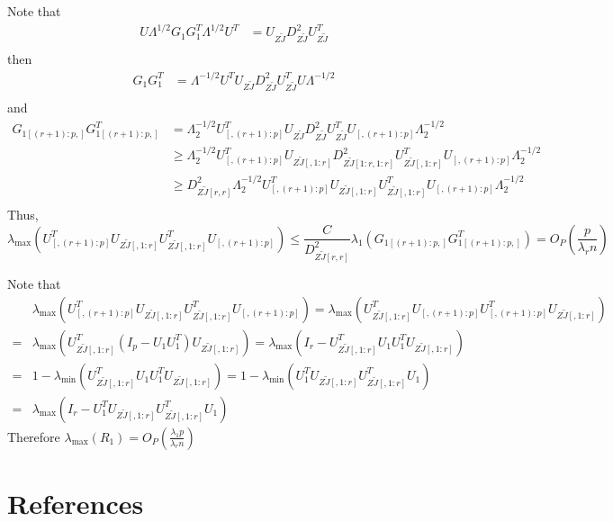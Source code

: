 \documentclass[review]{elsarticle}
\theoremstyle{plain}
\theoremstyle{definition}
\theoremstyle{remark}
\begin{document}
Note that
$$
\begin{aligned}
U\Lambda^{1/2} G_1 G_1^T \Lambda^{1/2} U^T 
    &=U_{Z\tilde{J}}D_{Z\tilde{J}}^2 U_{Z\tilde{J}}^T\\
\end{aligned}
$$
then
$$
\begin{aligned}
G_1 G_1^T  
    &=\Lambda^{-1/2} U^T U_{Z\tilde{J}}D_{Z\tilde{J}}^2 U_{Z\tilde{J}}^TU\Lambda^{-1/2}\\
\end{aligned}
$$
and
$$
\begin{aligned}
    G_{1[(r+1):p,]} G_{1[(r+1):p,]}^T  
    &=\Lambda_{2}^{-1/2} U_{[,(r+1):p]}^T U_{Z\tilde{J}}D_{Z\tilde{J}}^2 U_{Z\tilde{J}}^T U_{[,(r+1):p]}\Lambda_{2}^{-1/2}\\
    &\geq
    \Lambda_{2}^{-1/2} U_{[,(r+1):p]}^T U_{Z\tilde{J}[,1:r]}D_{Z\tilde{J}[1:r,1:r]}^2 U_{Z\tilde{J}[,1:r]}^T U_{[,(r+1):p]}\Lambda_{2}^{-1/2}\\
    &\geq
    D_{Z\tilde{J}[r,r]}^2
    \Lambda_{2}^{-1/2} U_{[,(r+1):p]}^T U_{Z\tilde{J}[,1:r]} U_{Z\tilde{J}[,1:r]}^T U_{[,(r+1):p]}\Lambda_{2}^{-1/2}\\
\end{aligned}
$$
Thus,
$$
\lambda_{\max}(U_{[,(r+1):p]}^T U_{Z\tilde{J}[,1:r]} U_{Z\tilde{J}[,1:r]}^T U_{[,(r+1):p]})\leq 
\frac{C}{D^2_{Z\tilde{J}[r,r]}} \lambda_{1}
    (G_{1[(r+1):p,]} G_{1[(r+1):p,]}^T)
=O_P(\frac{p}{\lambda_r n})
$$

Note that
$$
\begin{aligned}
    &\lambda_{\max}(U_{[,(r+1):p]}^T U_{Z\tilde{J}[,1:r]} U_{Z\tilde{J}[,1:r]}^T U_{[,(r+1):p]})
=
\lambda_{\max}( U_{Z\tilde{J}[,1:r]}^T U_{[,(r+1):p]}U_{[,(r+1):p]}^T U_{Z\tilde{J}[,1:r]})\\
    =&
    \lambda_{\max}( U_{Z\tilde{J}[,1:r]}^T (I_p- U_1 U_1^T) U_{Z\tilde{J}[,1:r]})=
    \lambda_{\max}(I_r- U_{Z\tilde{J}[,1:r]}^T  U_1 U_1^T U_{Z\tilde{J}[,1:r]})\\
    =&
    1-\lambda_{\min}( U_{Z\tilde{J}[,1:r]}^T  U_1 U_1^T U_{Z\tilde{J}[,1:r]})
    =
    1-\lambda_{\min}(U_1^T U_{Z\tilde{J}[,1:r]}U_{Z\tilde{J}[,1:r]}^T U_1)\\
    =&
    \lambda_{\max}(I_r-U_1^T U_{Z\tilde{J}[,1:r]}U_{Z\tilde{J}[,1:r]}^T U_1)
\end{aligned}
$$
Therefore $\lambda_{\max}(R_1)=O_P(\frac{\lambda_1 p}{\lambda_r n})$

\section*{References}


\end{document}
